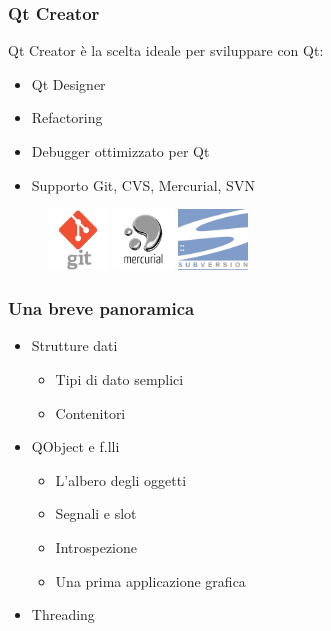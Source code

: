 \documentclass{beamer}
\begin{document}
\begin{frame}
	\frametitle{Qt Creator}
	Qt Creator è la scelta ideale per sviluppare con Qt:
	\begin{itemize}
		\item Qt Designer
		\item Refactoring
		\item Debugger ottimizzato per Qt
		\item Supporto Git, CVS, Mercurial, SVN
	\end{itemize}
	\vspace{0.5cm}
	\begin{figure}
		\includegraphics[height=1.6cm]{images/git.png}
		\qquad
		\includegraphics[height=1.6cm]{images/hg.png}
		\qquad
		\includegraphics[height=1.6cm]{images/svn.png}
	\end{figure}
\end{frame}

\begin{frame}
	\frametitle{Una breve panoramica}
	\begin{block}{}
		\begin{itemize}
			\item Strutture dati
			\begin{itemize}
				\item Tipi di dato semplici
				\item Contenitori
			\end{itemize}
			\item QObject e f.lli
			\begin{itemize}
				\item L'albero degli oggetti
				\item Segnali e slot
				\item Introspezione
				\item Una prima applicazione grafica
			\end{itemize}
			\item Threading
		\end{itemize}
	\end{block}
\end{frame}
\end{document}
